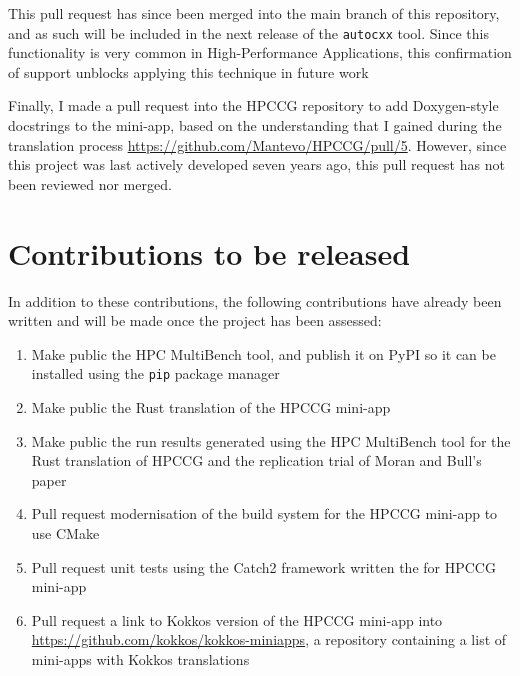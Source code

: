 
This pull request has since been merged into the main branch of this repository, and as such will be included in the next release of the \texttt{autocxx} tool. Since this functionality is very common in High-Performance Applications, this confirmation of support unblocks applying this technique in future work

Finally, I made a pull request into the HPCCG repository to add Doxygen-style docstrings to the mini-app, based on the understanding that I gained during the translation process \url{https://github.com/Mantevo/HPCCG/pull/5}. However, since this project was last actively developed seven years ago, this pull request has not been reviewed nor merged.

\section{Contributions to be released}
\label{sec:open-source-to-be-released}

In addition to these contributions, the following contributions have already been written and will be made once the project has been assessed:

\begin{enumerate}
    \item Make public the HPC MultiBench tool, and publish it on PyPI so it can be installed using the \texttt{pip} package manager
    \item Make public the Rust translation of the HPCCG mini-app
    \item Make public the run results generated using the HPC MultiBench tool for the Rust translation of HPCCG and the replication trial of Moran and Bull's paper \cite{moranEmergingTechnologiesRust2023}
    \item Pull request modernisation of the build system for the HPCCG mini-app to use CMake
    \item Pull request unit tests using the Catch2 framework written the for HPCCG mini-app
    \item Pull request a link to Kokkos version of the HPCCG mini-app into \url{https://github.com/kokkos/kokkos-miniapps}, a repository containing a list of mini-apps with Kokkos translations
\end{enumerate}


